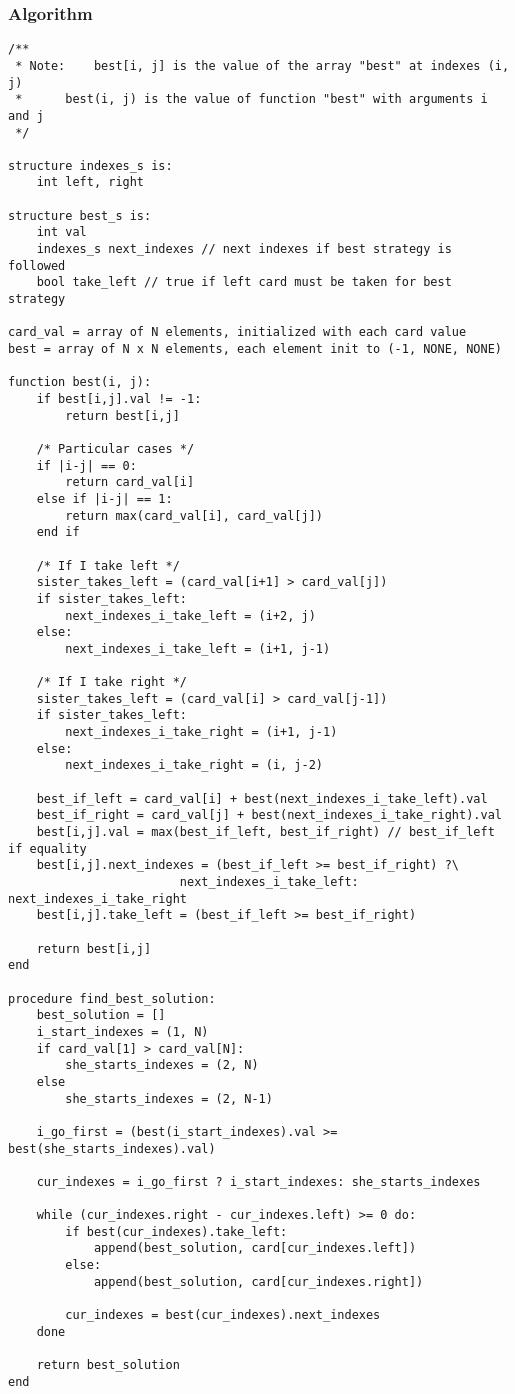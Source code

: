 \documentclass[11pt]{article}
\begin{document}
\subsubsection{Algorithm}
\begin{lstlisting}
/**
 * Note: 	best[i, j] is the value of the array "best" at indexes (i, j)
 *		best(i, j) is the value of function "best" with arguments i and j
 */

structure indexes_s is:
	int left, right

structure best_s is:
	int val
	indexes_s next_indexes // next indexes if best strategy is followed
	bool take_left // true if left card must be taken for best strategy

card_val = array of N elements, initialized with each card value
best = array of N x N elements, each element init to (-1, NONE, NONE)

function best(i, j):
	if best[i,j].val != -1:
		return best[i,j]
	
	/* Particular cases */
	if |i-j| == 0:
		return card_val[i]
	else if |i-j| == 1:
		return max(card_val[i], card_val[j])
	end if

	/* If I take left */
	sister_takes_left = (card_val[i+1] > card_val[j])
	if sister_takes_left:
		next_indexes_i_take_left = (i+2, j)
	else:
		next_indexes_i_take_left = (i+1, j-1)

	/* If I take right */
	sister_takes_left = (card_val[i] > card_val[j-1])
	if sister_takes_left:
		next_indexes_i_take_right = (i+1, j-1)
	else:
		next_indexes_i_take_right = (i, j-2)

	best_if_left = card_val[i] + best(next_indexes_i_take_left).val
	best_if_right = card_val[j] + best(next_indexes_i_take_right).val
	best[i,j].val = max(best_if_left, best_if_right) // best_if_left if equality
	best[i,j].next_indexes = (best_if_left >= best_if_right) ?\
						next_indexes_i_take_left: next_indexes_i_take_right
	best[i,j].take_left = (best_if_left >= best_if_right)

	return best[i,j]
end

procedure find_best_solution:
	best_solution = []
	i_start_indexes = (1, N)
	if card_val[1] > card_val[N]:
		she_starts_indexes = (2, N)
	else
		she_starts_indexes = (2, N-1)

	i_go_first = (best(i_start_indexes).val >= best(she_starts_indexes).val)

	cur_indexes = i_go_first ? i_start_indexes: she_starts_indexes

	while (cur_indexes.right - cur_indexes.left) >= 0 do:
		if best(cur_indexes).take_left:
			append(best_solution, card[cur_indexes.left])
		else:
			append(best_solution, card[cur_indexes.right])
	
		cur_indexes = best(cur_indexes).next_indexes
	done

	return best_solution
end
\end{lstlisting}
\end{document}
